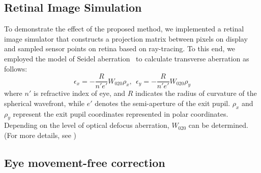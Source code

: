 \subsection{Retinal Image Simulation}
To demonstrate the effect of the proposed method, we implemented a retinal image simulator that constructs a projection matrix between pixels on display and sampled sensor points on retina based on ray-tracing. To this end, we employed the model of Seidel aberration~\cite{wyant92} to calculate transverse aberration as follows:
\begin{equation}
\epsilon_x = -\frac{R}{n'e'}W_{020}\rho_x,~~ \epsilon_y = -\frac{R}{n'e'}W_{020}\rho_y
\end{equation}
where $n'$ is refractive index of eye, and $R$ indicates the radius of curvature of the spherical wavefront, while $e'$ denotes the semi-aperture of the exit pupil. $\rho_x$ and $\rho_y$ represent the exit pupil coordinates represented in polar coordinates. Depending on the level of optical defocus aberration, $W_{020}$ can be determined. (For more details, see \cite{wyant92})


\subsection{Eye movement-free correction}

